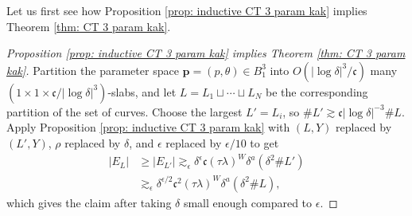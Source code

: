 \documentclass[12pt]{amsart}
\numberwithin{equation}{section}
\newcommand{\1}{\mathbbm{1}}
\newcommand{\p}{\mathbf p}
\begin{document}
Let us first see how Proposition \ref{prop: inductive CT 3 param kak} implies Theorem \ref{thm: CT 3 param kak}. 
\begin{proof}[Proposition \ref{prop: inductive CT 3 param kak} implies Theorem \ref{thm: CT 3 param kak}]
    Partition the parameter space $\p = (p,\theta) \in B_1^3$ into $O(|\log \delta|^3/\mathfrak c)$ many $(1 \times 1 \times \mathfrak c / |\log\delta|^3)$-slabs,
    and let $L = L_1 \sqcup \cdots \sqcup L_N$ be the corresponding partition of the set of curves. Choose the largest $L' = L_i$, so $\# L' \gtrsim \mathfrak c |\log \delta|^{-3} \# L$. Apply Proposition \ref{prop: inductive CT 3 param kak} with $(L,Y)$ replaced by $(L',Y)$, $\rho$ replaced by $\delta$, and $\epsilon$ replaced  by $\epsilon / 10$ to get 
    \begin{align}
        |E_{L}| &\geq |E_{L'}| \gtrsim_\epsilon \delta^\epsilon \mathfrak c (\tau \lambda)^W \delta^a (\delta^2 \# L') \\
        &\gtrsim_\epsilon \delta^{\epsilon/ 2} \mathfrak c^2 (\tau \lambda)^W \delta^a (\delta^2 \#L),
    \end{align}
    which gives the claim after taking $\delta$ small enough compared to $\epsilon$. 
\end{proof}
\end{document}
